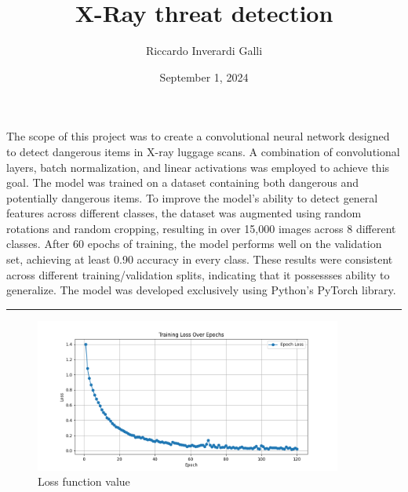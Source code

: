 \documentclass[twocolumn, fontsize=10pt]{article}
\title{
\Large X-Ray threat detection \\
[10pt]
}
\date{September 1, 2024}
\author{Riccardo Inverardi Galli}
\makeatletter
\renewenvironment{abstract} %
 {\small
  \begin{center}
  \bfseries \abstractname\vspace{-.5em}\vspace{0pt}
  \end{center}
  \list{}{%
    \setlength{\leftmargin}{0mm}
    \setlength{\rightmargin}{\leftmargin}%
  }
  \item\relax}
 {\endlist}
\renewcommand{\maketitle}{\bgroup\setlength{\parindent}{0pt} %
\begin{flushleft}
  \textbf{\@title}
  \@author \\
  \@date
\end{flushleft}\egroup
}
\makeatother
\begin{document}
\twocolumn[ \maketitle ]

\begin{abstract}
    The scope of this project was to create a convolutional neural network designed to detect dangerous items in X-ray luggage scans. A combination of convolutional layers, batch normalization, and linear activations was employed to achieve this goal. The model was trained on a dataset containing both dangerous and potentially dangerous items. To improve the model's ability to detect general features across different classes, the dataset was augmented using random rotations and random cropping, resulting in over 15,000 images across 8 different classes. After 60 epochs of training, the model performs well on the validation set, achieving at least 0.90 accuracy in every class. These results were consistent across different training/validation splits, indicating that it possessses ability to generalize. The model was developed exclusively using Python's PyTorch library.
\end{abstract}

\rule{\linewidth}{0.5pt}




\begin{figure}
    \centering
    \includegraphics[width=0.9\textwidth]{loss_function.png}
    \caption{Loss function value}
\end{figure}
\end{document}
